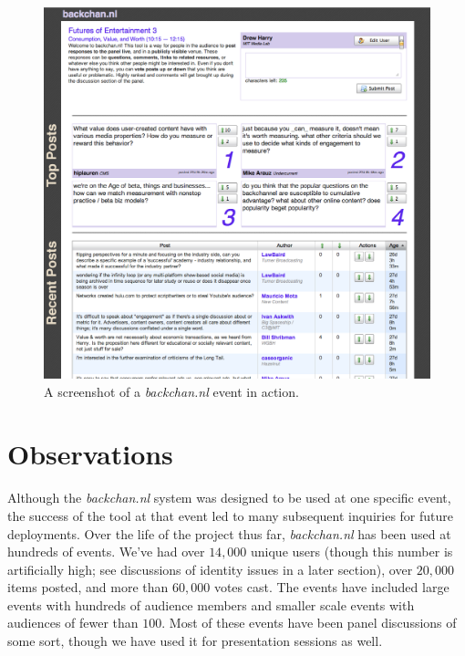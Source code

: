 \begin{figure}[t]
	\includegraphics{figures/backchannl/backchannl_screenshot.png}
	\caption{A screenshot of a \emph{backchan.nl} event in action.}
	\label{fig:backchannl_screenshot}
\end{figure}

\section{Observations}
Although the \emph{backchan.nl} system was designed to be used at one specific event, the success of the tool at that event led to many subsequent inquiries for future deployments. Over the life of the project thus far, \emph{backchan.nl} has been used at hundreds of events. We've had over $14,000$ unique users (though this number is artificially high; see discussions of identity issues in a later section), over $20,000$ items posted, and more than $60,000$ votes cast. The events have included large events with hundreds of audience members and smaller scale events with audiences of fewer than $100$. Most of these events have been panel discussions of some sort, though we have used it for presentation sessions as well.

